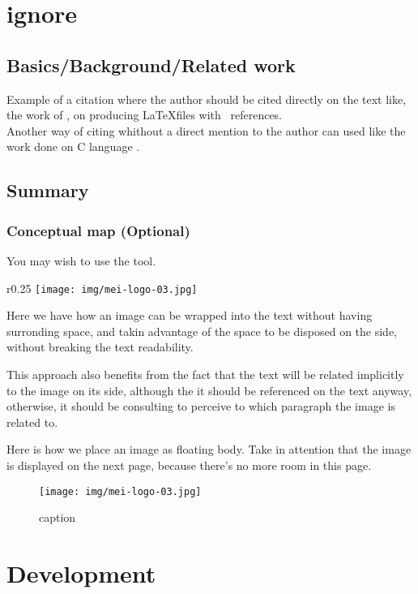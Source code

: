 \documentclass[
  oneside,
  11pt, a4paper,
  footinclude=true,
  headinclude=true,
  cleardoublepage=empty
]{scrbook}
\begin{document}
\newpage
\chapter{ignore}

	\section{Basics/Background/Related work}
	Example of a citation where the author should be cited directly on the text like, the work of \cite{GRM97}, on producing \LaTeX files with \Bibtex\ references. \\
	Another way of citing whithout a direct mention to the author can used like the work done on C language \cite{KeR88}.

     \section{Summary}
     	\subsection{Conceptual map (Optional)}
	You may wish to use the  tool.
	
	\begin{wrapfigure}{r}{0.25\textwidth}	
		\texttt{[image: img/mei-logo-03.jpg]}
	\end{wrapfigure}
	Here we have how an image can be wrapped into the text without having surronding space, and takin advantage of the space to be disposed on the side, without breaking the text readability.

	This approach also benefits from the fact that the text will be related implicitly to the image on its side, although the it should be referenced on the text anyway, otherwise, it should be consulting to perceive to which paragraph the image is related to.

	Here is how we place an image as floating body.
	Take in attention that the image is displayed on the next page, because there's no more room in this page.
	\begin{figure}
	\begin{center}
		\texttt{[image: img/mei-logo-03.jpg]}
	\end{center}
	\caption{caption}
	\end{figure}

	
	\chapter{Development}
		
\end{document}
